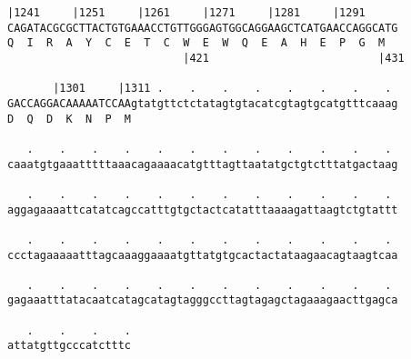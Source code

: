 \documentclass{article}
\begin{document}
\begin{Verbatim}[fontfamily=courier]
       |1241     |1251     |1261     |1271     |1281     |1291
CAGATACGCGCTTACTGTGAAACCTGTTGGGAGTGGCAGGAAGCTCATGAACCAGGCATG
Q  I  R  A  Y  C  E  T  C  W  E  W  Q  E  A  H  E  P  G  M  
                           |421                          |431

       |1301     |1311 .    .    .    .    .    .    .    . 
GACCAGGACAAAAATCCAAgtatgttctctatagtgtacatcgtagtgcatgtttcaaag
D  Q  D  K  N  P  M                                         

   .    .    .    .    .    .    .    .    .    .    .    . 
caaatgtgaaatttttaaacagaaaacatgtttagttaatatgctgtctttatgactaag

   .    .    .    .    .    .    .    .    .    .    .    . 
aggagaaaattcatatcagccatttgtgctactcatatttaaaagattaagtctgtattt

   .    .    .    .    .    .    .    .    .    .    .    . 
ccctagaaaaatttagcaaaggaaaatgttatgtgcactactataagaacagtaagtcaa

   .    .    .    .    .    .    .    .    .    .    .    . 
gagaaatttatacaatcatagcatagtagggccttagtagagctagaaagaacttgagca

   .    .    .    .
attatgttgcccatctttc
\end{Verbatim}
\newpage
\end{document}
